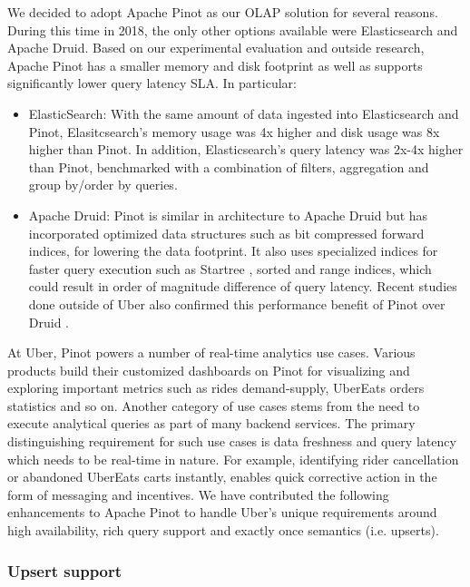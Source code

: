 \documentclass[sigconf]{acmart}
\begin{document}
We decided to adopt Apache Pinot as our OLAP solution for several reasons. During this time in 2018, the only other options available were Elasticsearch\cite{elastic} and Apache Druid\cite{yang2014druid}. Based on our experimental evaluation and outside research, Apache Pinot has a smaller memory and disk footprint as well as supports significantly lower query latency SLA. In particular: 
\begin{itemize}
\item ElasticSearch: With the same amount of data ingested into Elasticsearch and Pinot, Elasitcsearch's memory usage was 4x higher and disk usage was 8x higher than Pinot. In addition, Elasticsearch's query latency was 2x-4x higher than Pinot, benchmarked with a combination of filters, aggregation and group by/order by queries.

\item Apache Druid: Pinot is similar in architecture to Apache Druid but has incorporated optimized data structures such as bit compressed forward indices, for lowering the data footprint. It also uses specialized indices for faster query execution such as Startree \cite{im2018pinot}, sorted and range indices, which could result in order of magnitude difference of query latency. Recent studies done outside of Uber also confirmed this performance benefit of Pinot over Druid \cite{compareOlap} \cite{confluera}. 

\end{itemize}

At Uber, Pinot powers a number of real-time analytics use cases. Various products build their customized dashboards on Pinot for visualizing and exploring important metrics such as rides demand-supply, UberEats orders statistics and so on. Another category of use cases stems from the need to execute analytical queries as part of many backend services. The primary distinguishing requirement for such use cases is data freshness and query latency which needs to be real-time in nature. For example, identifying rider cancellation or abandoned UberEats carts instantly, enables quick corrective action in the form of messaging and incentives. We have contributed the following enhancements to Apache Pinot to handle Uber’s unique requirements around high availability, rich query support and exactly once semantics (i.e. upserts).

\subsubsection{Upsert support}
\end{document}
